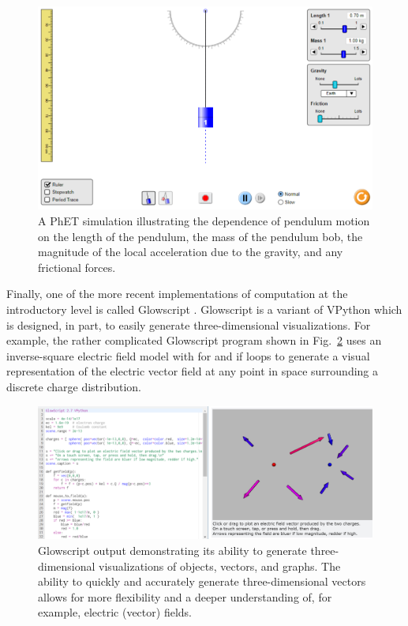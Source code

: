 \documentclass{msuphddissertation}
\begin{document}
\begin{doublespace}
\begin{figure}\center
\includegraphics[scale=0.50]{images/CH2PhET.pdf}
\caption{A PhET simulation illustrating the dependence of pendulum motion on the length of the pendulum, the mass of the pendulum bob, the magnitude of the local acceleration due to the gravity, and any frictional forces.}\label{CH2:PhET}
\end{figure}

Finally, one of the more recent implementations of computation at the introductory level is called Glowscript \cite{Chabay2008}.  Glowscript is a variant of VPython which is designed, in part, to easily generate three-dimensional visualizations.  For example, the rather complicated Glowscript program shown in Fig.~\ref{CH2:Glowscript} uses an inverse-square electric field model with for and if loops to generate a visual representation of the electric vector field at any point in space surrounding a discrete charge distribution. 

\begin{figure}\center
\includegraphics[scale=0.35]{images/CH2Glowscript.pdf}
\caption{Glowscript output demonstrating its ability to generate three-dimensional visualizations of objects, vectors, and graphs.  The ability to quickly and accurately generate three-dimensional vectors allows for more flexibility and a deeper understanding of, for example, electric (vector) fields.}\label{CH2:Glowscript}
\end{figure}


\end{doublespace}
\end{document}
